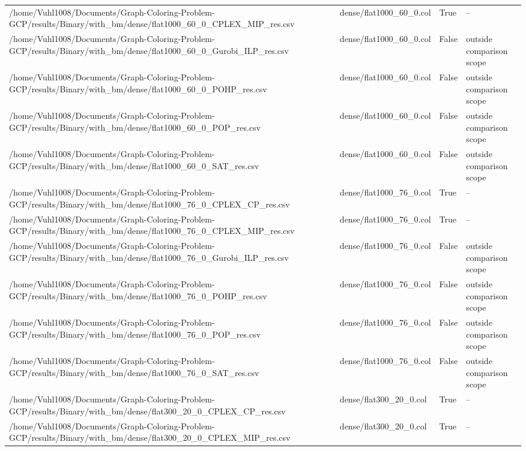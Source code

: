 \begin{table}[htbp]
\begin{tabular}{llll}
/home/Vuhl1008/Documents/Graph-Coloring-Problem-GCP/results/Binary/with\_bm/dense/flat1000\_60\_0\_CPLEX\_MIP\_res.csv & dense/flat1000\_60\_0.col & True & -- \\
/home/Vuhl1008/Documents/Graph-Coloring-Problem-GCP/results/Binary/with\_bm/dense/flat1000\_60\_0\_Gurobi\_ILP\_res.csv & dense/flat1000\_60\_0.col & False & outside comparison scope \\
/home/Vuhl1008/Documents/Graph-Coloring-Problem-GCP/results/Binary/with\_bm/dense/flat1000\_60\_0\_POHP\_res.csv & dense/flat1000\_60\_0.col & False & outside comparison scope \\
/home/Vuhl1008/Documents/Graph-Coloring-Problem-GCP/results/Binary/with\_bm/dense/flat1000\_60\_0\_POP\_res.csv & dense/flat1000\_60\_0.col & False & outside comparison scope \\
/home/Vuhl1008/Documents/Graph-Coloring-Problem-GCP/results/Binary/with\_bm/dense/flat1000\_60\_0\_SAT\_res.csv & dense/flat1000\_60\_0.col & False & outside comparison scope \\
/home/Vuhl1008/Documents/Graph-Coloring-Problem-GCP/results/Binary/with\_bm/dense/flat1000\_76\_0\_CPLEX\_CP\_res.csv & dense/flat1000\_76\_0.col & True & -- \\
/home/Vuhl1008/Documents/Graph-Coloring-Problem-GCP/results/Binary/with\_bm/dense/flat1000\_76\_0\_CPLEX\_MIP\_res.csv & dense/flat1000\_76\_0.col & True & -- \\
/home/Vuhl1008/Documents/Graph-Coloring-Problem-GCP/results/Binary/with\_bm/dense/flat1000\_76\_0\_Gurobi\_ILP\_res.csv & dense/flat1000\_76\_0.col & False & outside comparison scope \\
/home/Vuhl1008/Documents/Graph-Coloring-Problem-GCP/results/Binary/with\_bm/dense/flat1000\_76\_0\_POHP\_res.csv & dense/flat1000\_76\_0.col & False & outside comparison scope \\
/home/Vuhl1008/Documents/Graph-Coloring-Problem-GCP/results/Binary/with\_bm/dense/flat1000\_76\_0\_POP\_res.csv & dense/flat1000\_76\_0.col & False & outside comparison scope \\
/home/Vuhl1008/Documents/Graph-Coloring-Problem-GCP/results/Binary/with\_bm/dense/flat1000\_76\_0\_SAT\_res.csv & dense/flat1000\_76\_0.col & False & outside comparison scope \\
/home/Vuhl1008/Documents/Graph-Coloring-Problem-GCP/results/Binary/with\_bm/dense/flat300\_20\_0\_CPLEX\_CP\_res.csv & dense/flat300\_20\_0.col & True & -- \\
/home/Vuhl1008/Documents/Graph-Coloring-Problem-GCP/results/Binary/with\_bm/dense/flat300\_20\_0\_CPLEX\_MIP\_res.csv & dense/flat300\_20\_0.col & True & -- \\

\end{tabular}
\end{table}
